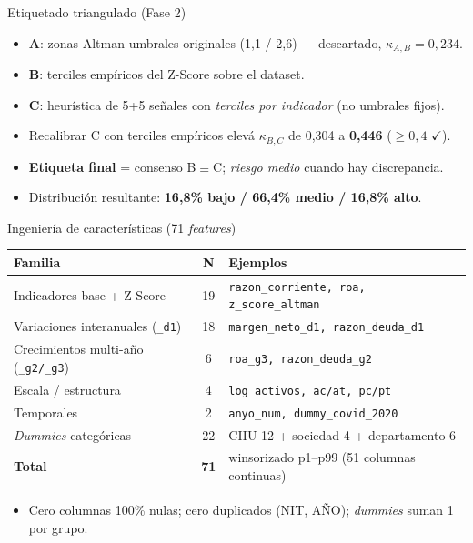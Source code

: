 \documentclass[10pt, aspectratio=169, xcolor=dvipsnames]{beamer}
\newcommand{\zaltscore}{Z\textquotesingle\textquotesingle-Score}
\begin{document}
\begin{frame}{Etiquetado triangulado (Fase 2)}
\begin{itemize}
  \item \textbf{A}: zonas Altman umbrales originales (1{,}1 / 2{,}6) --- descartado, $\kappa_{A,B}=0{,}234$.
  \item \textbf{B}: terciles emp\'iricos del \zaltscore{} sobre el dataset.
  \item \textbf{C}: heur\'istica de 5+5 se\~nales con \emph{terciles por indicador} (no umbrales fijos).
  \item Recalibrar C con terciles emp\'iricos elev\'a $\kappa_{B,C}$ de 0{,}304 a \textbf{0{,}446} ($\geq 0{,}4$ $\checkmark$).
  \item \textbf{Etiqueta final} = consenso B$\equiv$C; \emph{riesgo medio} cuando hay discrepancia.
  \item Distribuci\'on resultante: \textbf{16,8\% bajo / 66,4\% medio / 16,8\% alto}.
\end{itemize}
\end{frame}

\begin{frame}{Ingenier\'ia de caracter\'isticas (71 \emph{features})}
\centering
\small
\setlength{\tabcolsep}{6pt}
\renewcommand{\arraystretch}{1.1}
\begin{tabular}{@{}l c l@{}}
\toprule
\textbf{Familia} & \textbf{N} & \textbf{Ejemplos} \\
\midrule
Indicadores base + \zaltscore{}              & 19 & \texttt{razon\_corriente, roa, z\_score\_altman} \\
Variaciones interanuales (\texttt{\_d1})     & 18 & \texttt{margen\_neto\_d1, razon\_deuda\_d1} \\
Crecimientos multi-a\~no (\texttt{\_g2/\_g3})& 6  & \texttt{roa\_g3, razon\_deuda\_g2} \\
Escala / estructura                          & 4  & \texttt{log\_activos, ac/at, pc/pt} \\
Temporales                                   & 2  & \texttt{anyo\_num, dummy\_covid\_2020} \\
\emph{Dummies} categ\'oricas                 & 22 & CIIU 12 + sociedad 4 + departamento 6 \\
\midrule
\textbf{Total}                               & \textbf{71} & winsorizado p1--p99 (51 columnas continuas) \\
\bottomrule
\end{tabular}
\medskip
\begin{itemize}
  \item Cero columnas 100\% nulas; cero duplicados (NIT, A\~NO); \emph{dummies} suman 1 por grupo.
\end{itemize}
\end{frame}
\end{document}
